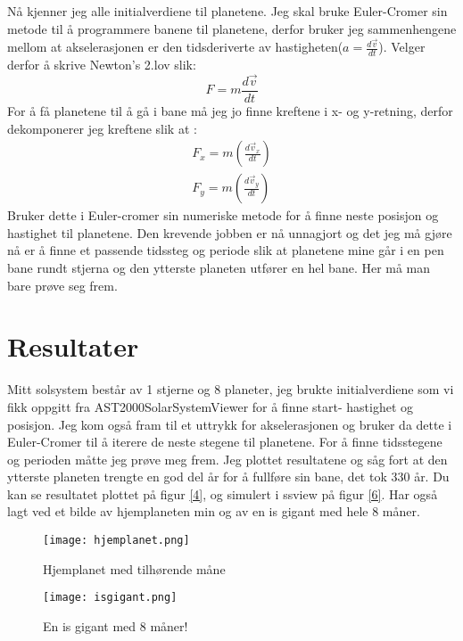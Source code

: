 \documentclass[12pt,preprint]{aastex6}
\begin{document}
Nå kjenner jeg alle initialverdiene til planetene. Jeg skal bruke Euler-Cromer sin metode til å programmere banene til planetene, derfor bruker jeg sammenhengene mellom at akselerasjonen er den tidsderiverte av hastigheten($a=\frac{d\vec{v}}{dt}$). Velger derfor å skrive Newton's 2.lov slik:
$$F = m\frac{d\vec{v}}{dt}$$ 
For å få planetene til å gå i bane må jeg jo finne kreftene i x- og y-retning, derfor dekomponerer jeg kreftene slik at :
\begin{align*}
F_x = m(\frac{d\vec{v}_x}{dt})\\
F_y = m(\frac{d\vec{v}_y}{dt})
\end{align*}
Bruker dette i Euler-cromer sin numeriske metode for å finne neste posisjon og hastighet til planetene. 
Den krevende jobben er nå unnagjort og det jeg må gjøre nå er å finne et passende tidssteg og periode slik at planetene mine går i en pen bane rundt stjerna og den ytterste planeten utfører en hel bane. Her må man bare prøve seg frem.

\section{Resultater}
Mitt solsystem består av 1 stjerne og 8 planeter, jeg brukte initialverdiene som vi fikk oppgitt fra AST2000SolarSystemViewer for å finne start- hastighet og posisjon. Jeg kom også fram til et uttrykk for akselerasjonen og bruker da dette i Euler-Cromer til å iterere de neste stegene til planetene. For å finne tidsstegene og perioden måtte jeg prøve meg frem. Jeg plottet resultatene og såg fort at den ytterste planeten trengte en god del år for å fullføre sin bane, det tok 330 år. Du kan se resultatet plottet på figur \ref{4}, og simulert i ssview på figur \ref{6}. Har også lagt ved et bilde av hjemplaneten min og av en is gigant med hele 8 måner.

\begin{figure}[h!]
\begin{minipage}[b]{0.45\linewidth}
\centering
\texttt{[image: hjemplanet.png]} 
\caption{Hjemplanet med tilhørende måne}
\label{7}
\end{minipage}
\hspace{0.5cm}
\begin{minipage}[b]{0.45\linewidth}
\centering
\texttt{[image: isgigant.png]} 
\caption{En is gigant med 8 måner!}
\label{8}
\end{minipage}
\end{figure}
\end{document}
